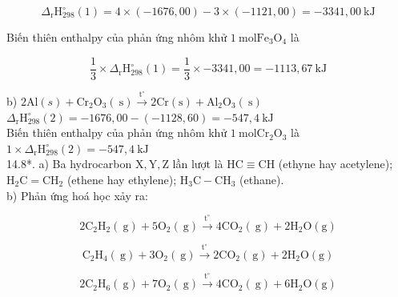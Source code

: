 \documentclass[10pt]{article}
\begin{document}
\begin{equation*}
\Delta_{\mathrm{r}} \mathrm{H}_{298}^{\circ}(1)=4 \times(-1676,00)-3 \times(-1121,00)=-3341,00 \mathrm{~kJ} \tag{1}
\end{equation*}


Biến thiên enthalpy của phản ứng nhôm khử $1 \mathrm{~mol} \mathrm{Fe}_{3} \mathrm{O}_{4}$ là


\begin{equation*}
\frac{1}{3} \times \Delta_{\mathrm{r}} \mathrm{H}_{298}^{\circ}(1)=\frac{1}{3} \times-3341,00=-1113,67 \mathrm{~kJ} \tag{2}
\end{equation*}


b) $2 \mathrm{Al}(s)+\mathrm{Cr}_{2} \mathrm{O}_{3}(\mathrm{~s}) \xrightarrow{\mathrm{t}^{\circ}} 2 \mathrm{Cr}(\mathrm{s})+\mathrm{Al}_{2} \mathrm{O}_{3}(\mathrm{~s})$\\
$\Delta_{\mathrm{r}} \mathrm{H}_{298}^{\circ}(2)=-1676,00-(-1128,60)=-547,4 \mathrm{~kJ}$\\
Biến thiên enthalpy của phản ứng nhôm khử $1 \mathrm{~mol} \mathrm{Cr}_{2} \mathrm{O}_{3}$ là\\
$1 \times \Delta_{\mathrm{r}} \mathrm{H}_{298}^{\circ}(2)=-547,4 \mathrm{~kJ}$\\
14.8*. a) Ba hydrocarbon $\mathrm{X}, \mathrm{Y}, \mathrm{Z}$ lần lượt là $\mathrm{HC} \equiv \mathrm{CH}$ (ethyne hay acetylene);\\
$\mathrm{H}_{2} \mathrm{C}=\mathrm{CH}_{2}$ (ethene hay ethylene); $\mathrm{H}_{3} \mathrm{C}-\mathrm{CH}_{3}$ (ethane).\\
b) Phản ứng hoá học xảy ra:


\begin{equation*}
2 \mathrm{C}_{2} \mathrm{H}_{2}(\mathrm{~g})+5 \mathrm{O}_{2}(\mathrm{~g}) \xrightarrow{\mathrm{t}^{\circ}} 4 \mathrm{CO}_{2}(\mathrm{~g})+2 \mathrm{H}_{2} \mathrm{O}(\mathrm{g}) \tag{3}
\end{equation*}



\begin{equation*}
\mathrm{C}_{2} \mathrm{H}_{4}(\mathrm{~g})+3 \mathrm{O}_{2}(\mathrm{~g}) \xrightarrow{\mathrm{t}^{\circ}} 2 \mathrm{CO}_{2}(\mathrm{~g})+2 \mathrm{H}_{2} \mathrm{O}(\mathrm{g}) \tag{4}
\end{equation*}



\begin{equation*}
2 \mathrm{C}_{2} \mathrm{H}_{6}(\mathrm{~g})+7 \mathrm{O}_{2}(\mathrm{~g}) \xrightarrow{\mathrm{t}^{\circ}} 4 \mathrm{CO}_{2}(\mathrm{~g})+6 \mathrm{H}_{2} \mathrm{O}(\mathrm{g}) \tag{5}
\end{equation*}
\end{document}
